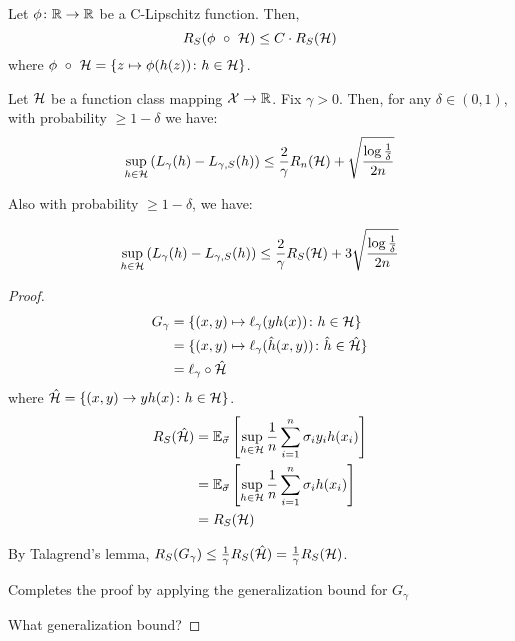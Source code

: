 \begin{lemma}
    Let \(\phi \colon \mathbb{R} \to \mathbb{R}\) be a C-Lipschitz function. Then, 
    \[
        R_S (\phi \ \circ \ \Hcal) \leq C \cdot R_S(\Hcal)  
    \]
    where \(\phi \ \circ \ \mathcal{H} = \{z \mapsto \phi(h(z)) \colon h \in \mathcal{H}\}\).  
\end{lemma}

\begin{theorem}
    Let \(\mathcal{H}\) be a function class mapping \(\mathcal{X} \to \mathbb{R}\). Fix \(\gamma > 0\). Then, 
    for any \(\delta \in (0,1)\), with probability \(\geq 1 - \delta\) we have: 
    \[
        \sup_{h \in \mathcal{H}} \left( L_\gamma (h) - L_{\gamma, S} (h) \right)  
        \leq \frac{2}{\gamma} R_n(\mathcal{H}) + \sqrt{ \frac{\log \frac{1}{\delta}}{2n} }  
    \]

    Also with probability \(\geq 1 - \delta\), we have: 

    \[
        \sup_{h \in \mathcal{H}} \left( L_\gamma (h) - L_{\gamma, S} (h) \right)  
        \leq \frac{2}{\gamma} R_S(\mathcal{H}) + 3\sqrt{ \frac{\log \frac{1}{\delta}}{2n} }  
    \]
\end{theorem}


\begin{proof}
    \begin{align*}
        G_\gamma &= \{ (x,y) \mapsto \ell_\gamma (yh(x)) \colon h \in \mathcal{H} \} \\ 
                 &= \{ (x,y) \mapsto \ell_\gamma (\hat{h}(x, y)) \colon \hat{h} \in \hat{\mathcal{H}}  \} \\ 
                 &= \ell_\gamma \circ \hat{\mathcal{H}}
    \end{align*}
    where \(\hat{\mathcal{H}} = \{ (x,y) \to yh(x) \colon h \in \mathcal{H} \}\). 
    \begin{align*}
        R_S(\hat{\mathcal{H}}) &= \mathbb{E}_{\vec{\sigma}} \left[ \sup_{h \in \mathcal{H}} \frac{1}{n} \sum_{i=1}^n 
        \sigma_i y_i h(x_i) \right] \\ 
                         &= \mathbb{E}_{\vec{\sigma}} \left[ \sup_{h \in \mathcal{H}} \frac{1}{n} \sum_{i=1}^n 
                         \sigma_i h(x_i) \right] \\ 
                         &= R_S (\mathcal{H})
    \end{align*}

    By Talagrend's lemma, \(R_S(G_\gamma) \leq \frac{1}{\gamma} R_S(\hat{\mathcal{H}}) = \frac{1}{\gamma}
    R_S(\mathcal{H})\). 

    Completes the proof by applying the generalization bound for \(G_\gamma\) 
    

    \color{red} What generalization bound?
\end{proof}